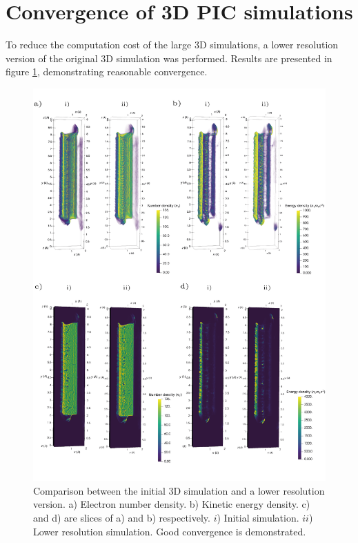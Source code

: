 \section{Convergence of 3D PIC simulations}\label{sec:app-pic_convergence3D}
To reduce the computation cost of the large 3D simulations, a lower resolution version of the original 3D simulation was performed. Results are presented in figure \ref{fig:zvp3dcomparelowres}, demonstrating reasonable convergence.
\begin{figure}
	\centering
	\includegraphics[width=1\linewidth]{figures/zvp/zvp_3D_compare_lowres}
	\caption[Comparison between the initial 3D simulation and a lower resolution version.]{Comparison between the initial 3D simulation and a lower resolution version. a) Electron number density. b) Kinetic energy density. c) and d) are slices of a) and b) respectively. $i$) Initial simulation. $ii$) Lower resolution simulation. Good convergence is demonstrated.}
	\label{fig:zvp3dcomparelowres}
\end{figure}
